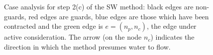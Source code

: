 \documentclass[preprint,a4paper]{elsarticle}
\newenvironment{stusubfig}[1]
{
	\begin{figure}[#1]
	\begin{center}
}
{
	\end{center}
	\end{figure}
}
\begin{document}
\begin{stusubfig}{p}
	\hspace{4mm}%
\caption[Case analysis for step 2(c) of the SW method]{Case analysis for step 2(c) of the SW method: black edges are non-guards, red edges are guards, blue edges are those which have been contracted and the green edge is $e = (n_p,n_c)$, the edge under active consideration. The arrow (on the node $n_c$) indicates the direction in which the method presumes water to flow.}
\label{fig:segmentation-waterfall-nicholls-cases}
\end{stusubfig}
\end{document}
